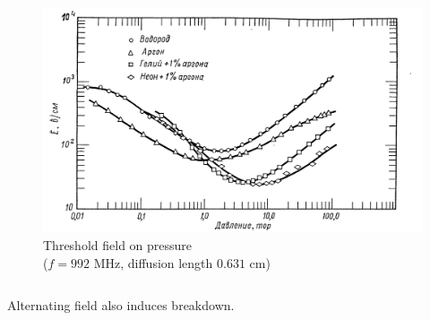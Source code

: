 \documentclass{beamer}
\begin{document}
\begin{frame}
\begin{columns}
			\begin{figure}
				\centering
				\includegraphics[width=1\linewidth]{res/microwave_discharge.png}
				\caption*{Threshold field on pressure\\ ($f = 992$ MHz, diffusion length $0.631$ cm)}
			\end{figure}
			
		\end{columns}		
		
		Alternating field also induces breakdown.
		
	\end{frame}
	
\end{document}
